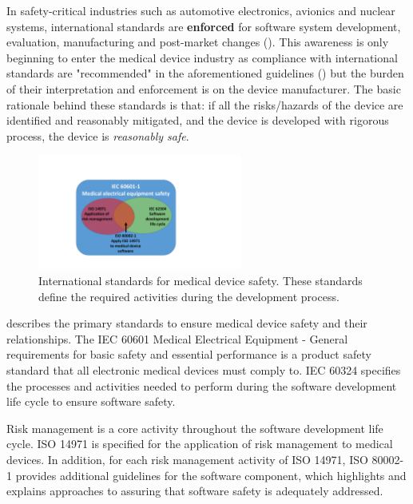 In safety-critical industries such as automotive electronics, avionics and nuclear systems, international standards are \textbf{enforced} for software system development, evaluation, manufacturing and post-market changes (\cite{autosar,avsi}). This awareness is only beginning to enter the medical device industry as compliance with international standards are "recommended" in the aforementioned guidelines (\cite{formal_fda}) but the burden of their interpretation and enforcement is on the device manufacturer. The basic rationale behind these standards is that: if all the risks/hazards of the device are identified and reasonably mitigated, and the device is developed with rigorous process, the device is \emph{reasonably safe}. 
\begin{figure}[t]
		\centering
		\includegraphics[width=0.6\textwidth]{figs/stardards.pdf}
		\caption{\small International standards for medical device safety. These standards define the required activities during the development process.}
		\label{fig:standards}
\end{figure}

 describes the primary standards to ensure medical device safety and their relationships. The IEC 60601 Medical Electrical Equipment - General requirements for basic safety and essential performance is a product safety standard that all electronic medical devices must comply to. IEC 60324 specifies the processes and activities needed to perform during the software development life cycle to ensure software safety. 

Risk management is a core activity throughout the software development life cycle. ISO 14971 is specified for the application of risk management to medical devices. In addition, for each risk management activity of ISO 14971, ISO 80002-1 provides additional guidelines for the software component, which highlights and explains approaches to assuring that software safety is adequately addressed.

